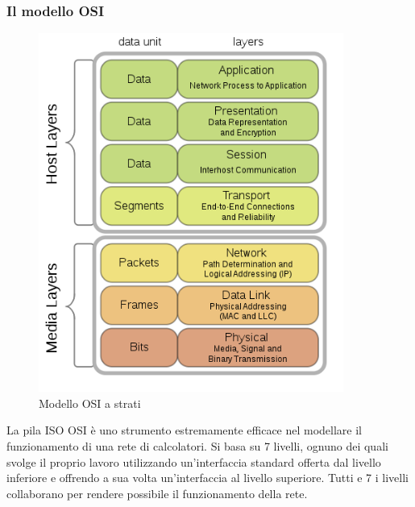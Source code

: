 \subsubsection{Il modello OSI}
\begin{figure}[ht]
    \centering
    \includegraphics[width=10cm]{figure/osi.png}
    \caption{Modello OSI a strati}
\end{figure}

La pila ISO OSI è uno strumento estremamente efficace nel modellare il funzionamento di una rete di calcolatori.
Si basa su 7 livelli, ognuno dei quali svolge il proprio lavoro utilizzando un'interfaccia standard offerta dal livello inferiore e offrendo a sua volta un'interfaccia al livello superiore.
Tutti e 7 i livelli collaborano per rendere possibile il funzionamento della rete.

